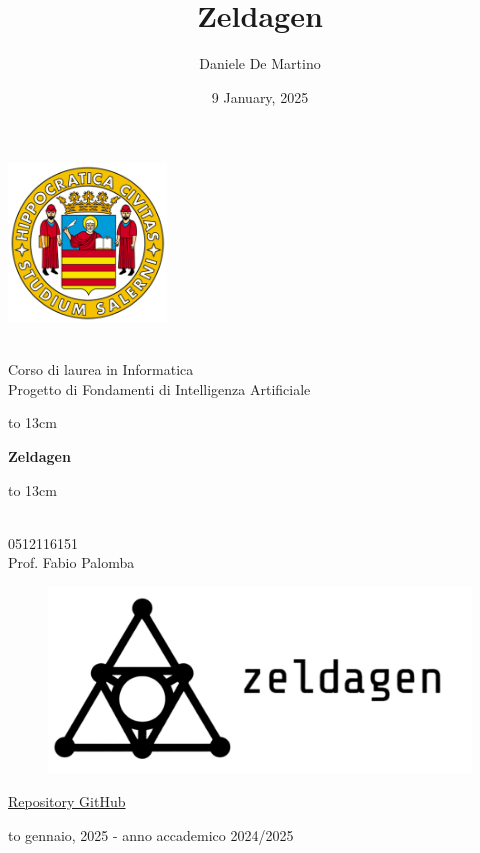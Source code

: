 \documentclass[12pt,titlepage]{article}
\title{Zeldagen}
\author{Daniele De Martino}
\date{9 January, 2025}
\begin{document}
\begin{titlepage}
  \begin{center}
    \centerline{\includegraphics[height=42mm]{assets/logo-unisa.png}}

    \vspace{0.5cm}
    { \\ Corso di laurea in Informatica}\\[1em]

    \vspace{1cm}
    {\sc \large Progetto di Fondamenti di Intelligenza Artificiale}

    \vspace{0.2cm}
    \centerline{\hbox to 13cm{\hrulefill}}
    \vspace{0.3cm}
    {\sc \Large {\textbf{Zeldagen}}}
    \centerline{\hbox to 13cm{\hrulefill}}

    \vspace{1.2cm}
    {\\
    0512116151 \\ [1 cm]
    \large Prof. Fabio Palomba}

    \vspace{3cm}

    \begin{figure}[h]
    \centering
    \begin{minipage}{.5\textwidth}
    \centering
    \href{https://github.com/DanielVip3/zeldagen}{\includegraphics[width=.7\linewidth]{assets/zeldagen-logo-transparent-long.png}}
    \end{minipage}%
    \end{figure}

    \href{https://github.com/DanielVip3/zeldagen}{\large Repository GitHub}

    \vspace{0.3cm}

    \hbox to \textwidth{\hrulefill}
    \vspace{0.2cm}
    {\sc  gennaio, 2025 - anno accademico 2024/2025}
  \end{center}
\end{titlepage}
\end{document}
